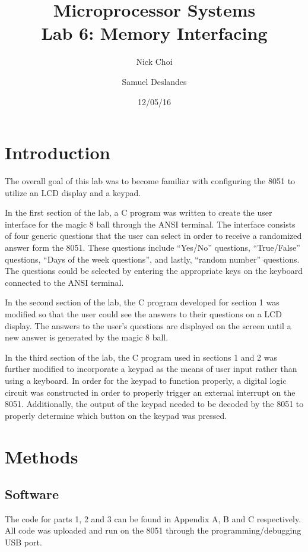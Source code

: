 \documentclass[12pt]{article}
\begin{document}
\title{Microprocessor Systems\\ Lab 6: Memory Interfacing }
\author{Nick Choi \and Samuel Deslandes}
\date{12/05/16}
\maketitle
\pagebreak
\section{Introduction}
The overall goal of this lab was to become familiar with configuring the 8051 to utilize an LCD display and a keypad. 

In the first section of the lab, a C program was written to create the user interface for the magic 8 ball through the ANSI terminal. The interface consists of four generic questions that the user can select in order to receive a randomized answer form the 8051. These questions include “Yes/No” questions, “True/False” questions, “Days of the week questions”, and lastly, “random number” questions. The questions could be selected by entering the appropriate keys on the keyboard connected to the ANSI terminal.  

In the second section of the lab, the C program developed for section 1 was modified so that the user could see the answers to their questions on a LCD display. The answers to the user’s questions are displayed on the screen until a new answer is generated by the magic 8 ball. 

In the third section of the lab, the C program used in sections 1 and 2 was further modified to incorporate a keypad as the means of user input rather than using a keyboard. In order for the keypad to function properly, a digital logic circuit was constructed in order to properly trigger an external interrupt on the 8051. Additionally, the output of the keypad needed to be decoded by the 8051 to properly determine which button on the keypad was pressed. 


\section{Methods}
\subsection{Software}
The code for parts 1, 2 and 3 can be found in Appendix A, B and C respectively. All code was uploaded and run on the 8051 through the programming/debugging USB port. 
\end{document}
